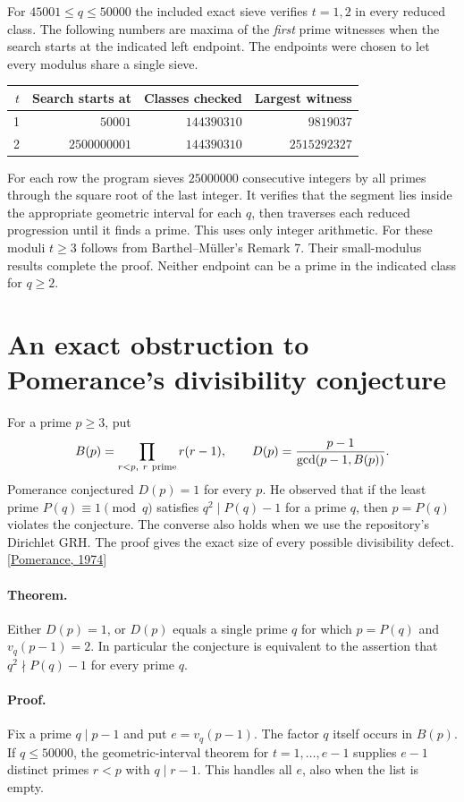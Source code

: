 For $45001\le q\le50000$ the included exact sieve verifies $t=1,2$
in every reduced class. The following numbers are maxima of the
\emph{first} prime witnesses when the search starts at the indicated
left endpoint. The endpoints were chosen to let every modulus share a
single sieve.
\begin{center}
\begin{tabular}{rrrr}
$t$ & Search starts at & Classes checked & Largest witness\\ \hline
1 & $50001$ & $144390310$ & $9819037$\\
2 & $2500000001$ & $144390310$ & $2515292327$
\end{tabular}
\end{center}
For each row the program sieves $25000000$ consecutive integers by all
primes through the square root of the last integer. It verifies that the
segment lies inside the appropriate geometric interval for each $q$,
then traverses each reduced progression until it finds a prime. This
uses only integer arithmetic. For these moduli $t\ge3$ follows from
Barthel--M\"uller's Remark 7. Their small-modulus results complete the proof.
Neither endpoint can be a prime in the indicated class for $q\ge2$.

\section{An exact obstruction to Pomerance's divisibility conjecture}
For a prime $p\ge3$, put
\[
 B(p)=\prod_{r<p,\ r\ {\rm prime}}r(r-1),\qquad
 D(p)=\frac{p-1}{\gcd(p-1,B(p))}.
\]
Pomerance conjectured $D(p)=1$ for every $p$. He observed that if the
least prime $P(q)\equiv1\pmod q$ satisfies $q^2\mid P(q)-1$ for a
prime $q$, then $p=P(q)$ violates the conjecture. The converse also
holds when we use the repository's Dirichlet GRH. The proof gives the
exact size of every possible divisibility defect.
\hfill\href{https://math.dartmouth.edu/~carlp/PDF/carmichaelconjecture.pdf}{[Pomerance, 1974]}

\paragraph{Theorem.} Either $D(p)=1$, or $D(p)$ equals a single
prime $q$ for which $p=P(q)$ and $v_q(p-1)=2$. In particular the
conjecture is equivalent to the assertion that
$q^2\nmid P(q)-1$ for every prime $q$.

\paragraph{Proof.}
Fix a prime $q\mid p-1$ and put $e=v_q(p-1)$. The factor $q$ itself
occurs in $B(p)$. If $q\le50000$, the geometric-interval theorem for
$t=1,\ldots,e-1$ supplies $e-1$ distinct primes $r<p$ with
$q\mid r-1$. This handles all $e$, also when the list is empty.


